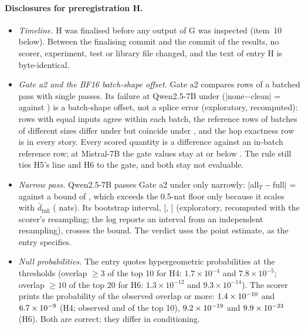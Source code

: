 \paragraph{Disclosures for preregistration H.}
\begin{itemize}\setlength\itemsep{1pt}
  \item \emph{Timeline.} H was finalised before any output of G was inspected (item~10 below). Between the finalising commit and the commit of the results, no scorer, experiment, test or library file changed, and the text of entry H is byte-identical.
  \item \emph{Gate a2 and the BF16 batch-shape offset.} Gate a2 compares rows of a batched pass with single passes. Its failure at Qwen2.5-7B under \fmtPost{} ($\lvert$none$-$clean$\rvert$ = \HatwoNoneCleanPostQwenSeven{} against \HatwoBoundPostQwenSeven{}) is a batch-shape offset, not a splice error (exploratory, recomputed): rows with equal inputs agree within each batch, the reference rows of batches of different sizes differ under \fmtPost{} but coincide under \fmtOpt{}, and the hop exactness row is \HatwoHopPostQwenSeven{} in every story. Every scored quantity is a difference against an in-batch reference row; at Mistral-7B the gate values stay at or below \HatwoAllFullPostMistralSeven{}. The rule still ties H5's \fmtPost{} line and H6 to the gate, and both stay not evaluable.
  \item \emph{Narrow pass.} Qwen2.5-7B passes Gate a2 under \fmtOpt{} only narrowly: $\lvert$all$_T-$full$\rvert$ = \HatwoAllFullOptQwenSeven{} against a bound of \HatwoBoundOptQwenSeven{}, which exceeds the 0.5-nat floor only because it scales with $\bar d_{\mathrm{full}}$ (\HathreeDfullOptQwenSeven{} nats). Its bootstrap interval, [\HatwoAllFullOptQwenSevenLo{}, \HatwoAllFullOptQwenSevenHi{}] (exploratory, recomputed with the scorer's resampling; the log reports an interval from an independent resampling), crosses the bound. The verdict uses the point estimate, as the entry specifies.
  \item \emph{Null probabilities.} The entry quotes hypergeometric probabilities at the thresholds (overlap $\geq 3$ of the top 10 for H4: $1.7 \times 10^{-4}$ and $7.8 \times 10^{-5}$; overlap $\geq 10$ of the top 20 for H6: $1.3 \times 10^{-12}$ and $9.3 \times 10^{-14}$). The scorer prints the probability of the observed overlap or more: $1.4\times 10^{-10}$ and $6.7\times 10^{-9}$ (H4; observed \HfourOverlapQwenSeven{} and \HfourOverlapMistralSeven{} of the top 10), $9.2\times 10^{-19}$ and $9.9\times 10^{-23}$ (H6). Both are correct; they differ in conditioning.

\end{itemize}
